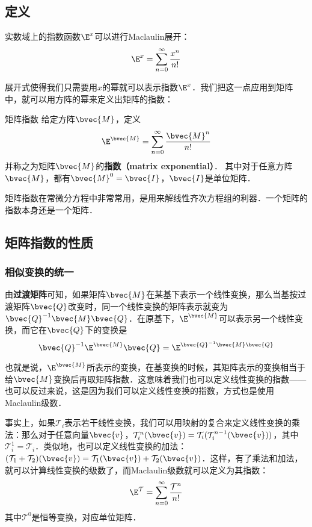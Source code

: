 

\subsection{定义}
实数域上的指数函数$\E^x$可以进行Maclaulin展开：\begin{equation}
\E^x=\sum\limits_{n=0}^\infty \frac{x^n}{n!}
\end{equation}

展开式使得我们只需要用$x$的幂就可以表示指数$\E^x$．我们把这一点应用到矩阵中，就可以用方阵的幂来定义出矩阵的指数：

\begin{definition}{矩阵指数}
给定方阵$\bvec{M}$，定义
\begin{equation}
\E^\bvec{M}=\sum_{n=0}^\infty \frac{\bvec{M}^n}{n!}
\end{equation}
并称之为矩阵$\bvec{M}$的\textbf{指数（matrix exponential）}． 其中对于任意方阵$\bvec{M}$，都有$\bvec{M}^0=\bvec{I}$，$\bvec{I}$是单位矩阵．
\end{definition}

矩阵指数在常微分方程中非常常用，是用来解线性齐次方程组的利器．一个矩阵的指数本身还是一个矩阵．

\subsection{矩阵指数的性质}

\subsubsection{相似变换的统一}

由\textbf{过渡矩阵}可知，如果矩阵$\bvec{M}$在某基下表示一个线性变换，那么当基按过渡矩阵$\bvec{Q}$改变时，同一个线性变换的矩阵表示就变为$\bvec{Q}^{-1}\bvec{M}\bvec{Q}$．在原基下，$\E^\bvec{M}$可以表示另一个线性变换，而它在$\bvec{Q}$下的变换是
\begin{equation}\label{MatExp_eq1}
\bvec{Q}^{-1}\E^\bvec{M}\bvec{Q}=\E^{\bvec{Q}^{-1}\bvec{M}\bvec{Q}}
\end{equation}

也就是说，$\E^\bvec{M}$所表示的变换，在基变换的时候，其矩阵表示的变换相当于给$\bvec{M}$变换后再取矩阵指数．这意味着我们也可以定义线性变换的指数——也可以反过来说，这是因为我们可以定义线性变换的指数，方式也是使用Maclaulin级数．

事实上，如果$\mathcal{T}_i$表示若干线性变换，我们可以用映射的复合来定义线性变换的乘法：那么对于任意向量$\bvec{v}$，$\mathcal{T}^n_i(\bvec{v})=\mathcal{T}_i(\mathcal{T}^{n-1}_i(\bvec{v}))$，其中$\mathcal{T}_i^1=\mathcal{T}_i$．类似地，也可以定义线性变换的加法：$(\mathcal{T}_1+\mathcal{T}_2)(\bvec{v})=\mathcal{T}_1(\bvec{v})+\mathcal{T}_2(\bvec{v})$．这样，有了乘法和加法，就可以计算线性变换的级数了，而Maclaulin级数就可以定义为其指数：
\begin{equation}
\E^\mathcal{T}=\sum\limits_{n=0}^\infty \frac{\mathcal{T}^n}{n!}
\end{equation}
其中$\mathcal{T}^0$是恒等变换，对应单位矩阵．

